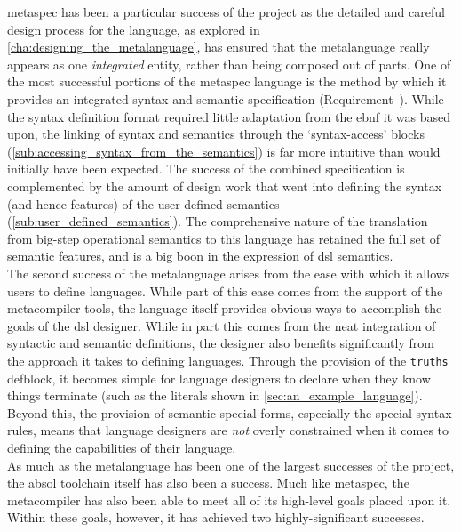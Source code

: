 \gls{metaspec} has been a particular success of the project as the detailed and careful design process for the language, as explored in \autoref{cha:designing_the_metalanguage}, has ensured that the metalanguage really appears as one \textit{integrated} entity, rather than being composed out of parts.
One of the most successful portions of the metaspec language is the method by which it provides an integrated syntax and semantic specification (Requirement~).
While the syntax definition format required little adaptation from the \gls{ebnf} it was based upon, the linking of syntax and semantics through the `syntax-access' blocks (\autoref{sub:accessing_syntax_from_the_semantics}) is far more intuitive than would initially have been expected. 
The success of the combined specification is complemented by the amount of design work that went into defining the syntax (and hence features) of the user-defined semantics (\autoref{sub:user_defined_semantics}).
The comprehensive nature of the translation from big-step operational semantics to this language has retained the full set of semantic features, and is a big boon in the expression of \gls{dsl} semantics.\\

The second success of the metalanguage arises from the ease with which it allows users to define languages. 
While part of this ease comes from the support of the metacompiler tools, the language itself provides obvious ways to accomplish the goals of the \gls{dsl} designer. 
While in part this comes from the neat integration of syntactic and semantic definitions, the designer also benefits significantly from the approach it takes to defining languages. 
Through the provision of the \texttt{truths} defblock, it becomes simple for language designers to declare when they know things terminate (such as the literals shown in \autoref{sec:an_example_language}).
Beyond this, the provision of semantic special-forms, especially the special-syntax rules, means that language designers are \textit{not} overly constrained when it comes to defining the capabilities of their language.\\

As much as the metalanguage has been one of the largest successes of the project, the \gls{absol} toolchain itself has also been a success. 
Much like \gls{metaspec}, the metacompiler has also been able to meet all of its high-level goals placed upon it.
Within these goals, however, it has achieved two highly-significant successes.\\

